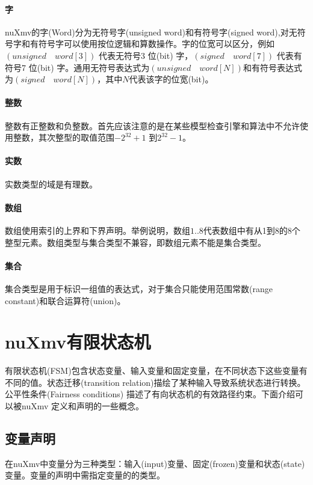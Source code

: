 \paragraph{字}
nuXmv的字(Word)分为无符号字(unsigned word)和有符号字(signed word),对无符号字和有符号字可以使用按位逻辑和算数操作。字的位宽可以区分，例如$\left(unsigned \quad word[3]\right)$ 代表无符号3 位(bit) 字，$\left(signed \quad word[7]\right)$ 代表有符号7 位(bit) 字。通用无符号表达式为$\left(unsigned \quad word[N]\right)$和有符号表达式为$\left(signed \quad word[N]\right)$，其中$N$代表该字的位宽(bit)。

\paragraph{整数}
整数有正整数和负整数。首先应该注意的是在某些模型检查引擎和算法中不允许使用整数，其次整型的取值范围$-2^{32}+1$ 到$2^{32}-1$。

\paragraph{实数}
实数类型的域是有理数。

\paragraph{数组}
数组使用索引的上界和下界声明。举例说明，数组$1..8$代表数组中有从1到8的8个整型元素。数组类型与集合类型不兼容，即数组元素不能是集合类型。

\paragraph{集合}
集合类型是用于标识一组值的表达式，对于集合只能使用范围常数(range constant)和联合运算符(union)。

\section{nuXmv有限状态机}
有限状态机(FSM)包含状态变量、输入变量和固定变量，在不同状态下这些变量有不同的值。状态迁移(transition relation)描绘了某种输入导致系统状态进行转换。公平性条件(Fairness conditions) 描述了有向状态机的有效路径约束。下面介绍可以被nuXmv 定义和声明的一些概念。

\subsection{变量声明}
在nuXmv中变量分为三种类型：输入(input)变量、固定(frozen)变量和状态(state)变量。变量的声明中需指定变量的的类型。

